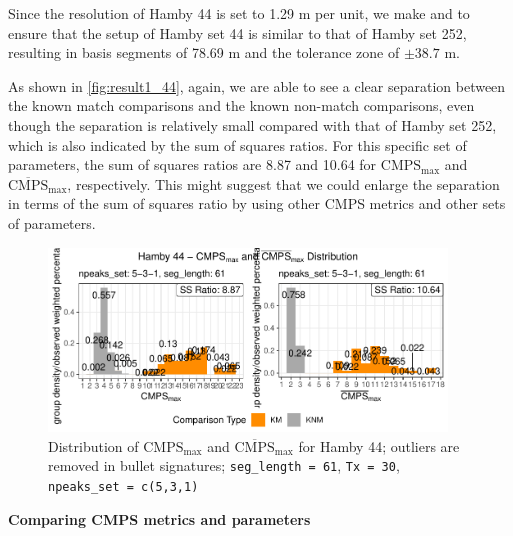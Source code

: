 Since the resolution of Hamby 44 is set to 1.29 \textmu m per unit, we
make  and  to ensure that the setup
of Hamby set 44 is similar to that of Hamby set 252, resulting in basis
segments of 78.69 \textmu m and the tolerance zone of \(\pm 38.7\)
\textmu m.

As shown in \autoref{fig:result1_44}, again, we are able to see a clear
separation between the known match comparisons and the known non-match
comparisons, even though the separation is relatively small compared
with that of Hamby set 252, which is also indicated by the sum of
squares ratios. For this specific set of parameters, the sum of squares
ratios are 8.87 and 10.64 for \(\mathrm{CMPS_{max}}\) and
\(\mathrm{\overline{CMPS}_{max}}\), respectively. This might suggest
that we could enlarge the separation in terms of the sum of squares
ratio by using other CMPS metrics and other sets of parameters.

\begin{Schunk}
\begin{figure}

{\centering \includegraphics[width=400px]{ju-hofmann_files/figure-latex/result1_44-1} 

}

\caption{Distribution of $\mathrm{CMPS_{max}}$ and $\mathrm{\overline{CMPS}_{max}}$ for Hamby 44; outliers are removed in bullet signatures; \texttt{seg\_length = 61}, \texttt{Tx = 30}, \texttt{npeaks\_set = c(5,3,1)} }\label{fig:result1_44}
\end{figure}
\end{Schunk}

\textbf{Comparing CMPS metrics and parameters}

